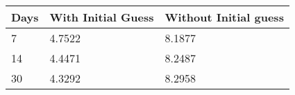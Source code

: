 \begin{tabular}{lll}
Days & With Initial Guess & Without Initial guess \\ 
\hline 
7 & 4.7522 & 8.1877 \\ 
14 & 4.4471 & 8.2487 \\ 
30 & 4.3292 & 8.2958 \\ 
\hline 
\end{tabular}